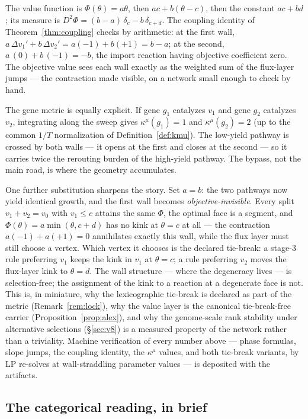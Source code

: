 \documentclass[11pt,a4paper]{article}
\theoremstyle{plain}
\theoremstyle{definition}
\theoremstyle{remark}
\newcommand{\kmu}{\kappa^{\mu}}
\begin{document}
The value function is $\Phi(\theta) = a\theta$, then $ac + b(\theta
- c)$, then the constant $ac + bd$; its measure is $D^2\Phi = (b -
a)\,\delta_c - b\,\delta_{c+d}$. The coupling identity of
Theorem~\ref{thm:coupling} checks by arithmetic: at the first
wall, $a\,\Delta v_1' + b\,\Delta v_2' = a(-1) + b(+1) = b - a$;
at the second, $a\,(0) + b\,(-1) = -b$, the import reaction having
objective coefficient zero. The objective value sees each wall
exactly as the weighted sum of the flux-layer jumps --- the
contraction made visible, on a network small enough to check by
hand.

The gene metric is equally explicit. If gene $g_1$ catalyzes $v_1$
and gene $g_2$ catalyzes $v_2$, integrating along the sweep gives
$\kmu(g_1) = 1$ and $\kmu(g_2) = 2$ (up to the common $1/T$
normalization of Definition~\ref{def:kmu}). The low-yield pathway
is crossed by both walls --- it opens at the first and closes at
the second --- so it carries twice the rerouting burden of the
high-yield pathway. The bypass, not the main road, is where the
geometry accumulates.

One further substitution sharpens the story. Set $a = b$: the two
pathways now yield identical growth, and the first wall becomes
\emph{objective-invisible}. Every split $v_1 + v_2 = v_0$ with $v_1
\le c$ attains the same $\Phi$, the optimal face is a segment, and
$\Phi(\theta) = a\min(\theta, c + d)$ has no kink at $\theta = c$
at all --- the contraction $a(-1) + a(+1) = 0$ annihilates exactly
this wall, while the flux layer must still choose a vertex. Which
vertex it chooses is the declared tie-break: a stage-3 rule
preferring $v_1$ keeps the kink in $v_1$ at $\theta = c$; a rule
preferring $v_2$ moves the flux-layer kink to $\theta = d$. The
wall structure --- where the degeneracy lives --- is
selection-free; the assignment of the kink to a reaction at a
degenerate face is not. This is, in miniature, why the
lexicographic tie-break is declared as part of the metric
(Remark~\ref{rem:lock}), why the value layer is the canonical
tie-break-free carrier (Proposition~\ref{prop:alex}), and why the
genome-scale rank stability under alternative selections
(\S\ref{sec:v8}) is a measured property of the network rather than
a triviality. Machine verification of every number above --- phase
formulas, slope jumps, the coupling identity, the $\kmu$ values,
and both tie-break variants, by LP re-solves at wall-straddling
parameter values --- is deposited with the artifacts.
\subsection{The categorical reading, in brief}\label{sec:categorical}
\end{document}
